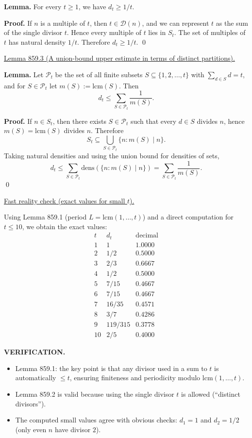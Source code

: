 \textbf{Lemma.}
For every $t\ge 1$, we have $d_t\ge 1/t$.

\textbf{Proof.}
If $n$ is a multiple of $t$, then $t\in\mathcal D(n)$, and we can represent $t$ as the sum of the single divisor $t$. Hence every multiple of $t$ lies in $S_t$.
The set of multiples of $t$ has natural density $1/t$.
Therefore $d_t\ge 1/t$.
\qed

\medskip
\noindent\underline{Lemma 859.3 (A union-bound upper estimate in terms of distinct partitions).}

\textbf{Lemma.}
Let $\mathcal P_t$ be the set of all finite subsets $S\subseteq\{1,2,\dots,t\}$ with $\sum_{d\in S} d=t$, and for $S\in\mathcal P_t$ let $m(S):=\mathrm{lcm}(S)$.
Then
\[
 d_t \le \sum_{S\in\mathcal P_t} \frac{1}{m(S)}.
\]

\textbf{Proof.}
If $n\in S_t$, then there exists $S\in\mathcal P_t$ such that every $d\in S$ divides $n$, hence $m(S)=\mathrm{lcm}(S)$ divides $n$.
Therefore
\[
S_t \subseteq \bigcup_{S\in\mathcal P_t} \{n: m(S)\mid n\}.
\]
Taking natural densities and using the union bound for densities of sets,
\[
 d_t \le \sum_{S\in\mathcal P_t} \mathrm{dens}(\{n: m(S)\mid n\}) = \sum_{S\in\mathcal P_t} \frac{1}{m(S)}.
\]
\qed

\medskip
\noindent\underline{Fast reality check (exact values for small $t$).}

Using Lemma 859.1 (period $L=\mathrm{lcm}(1,\dots,t)$) and a direct computation for $t\le 10$, we obtain the exact values:
\[
\begin{array}{c|c|c}
 t & d_t & \text{decimal}\\\hline
 1 & 1 & 1.0000\\
 2 & 1/2 & 0.5000\\
 3 & 2/3 & 0.6667\\
 4 & 1/2 & 0.5000\\
 5 & 7/15 & 0.4667\\
 6 & 7/15 & 0.4667\\
 7 & 16/35 & 0.4571\\
 8 & 3/7 & 0.4286\\
 9 & 119/315 & 0.3778\\
 10 & 2/5 & 0.4000
\end{array}
\]

\medskip
\noindent\textbf{VERIFICATION.}

\begin{itemize}
\item Lemma 859.1: the key point is that any divisor used in a sum to $t$ is automatically $\le t$, ensuring finiteness and periodicity modulo $\mathrm{lcm}(1,\dots,t)$.
\item Lemma 859.2 is valid because using the single divisor $t$ is allowed (``distinct divisors'').
\item The computed small values agree with obvious checks: $d_1=1$ and $d_2=1/2$ (only even $n$ have divisor $2$).
\end{itemize}

